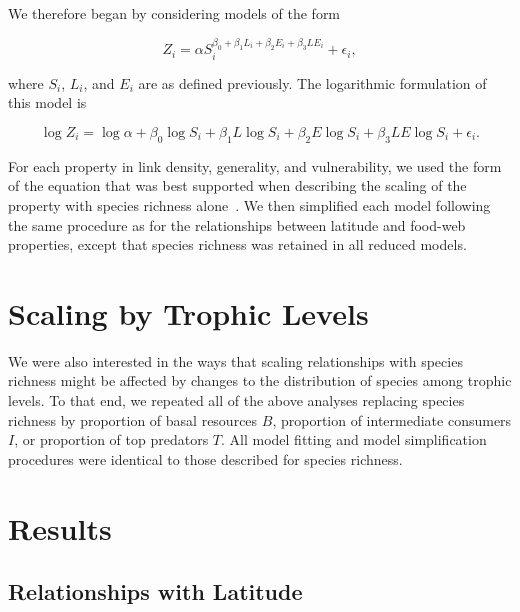 \documentclass[12pt]{article}
\begin{document}
  We therefore began by considering models of the form

  \begin{equation}
  \label{PowerLat}
  Z_{i}=\alpha S_{i}^{\beta_{0}+\beta_{1}L_{i}+\beta_{2}E_{i}+\beta_{3}LE_{i}} + \epsilon_{i} ,
  \end{equation}

  \noindent where $S_{i}$, $L_{i}$, and $E_{i}$ are as defined previously. The logarithmic formulation of this model is

  \begin{equation}
  \label{LogLat}
  \log{Z_{i}} = \log{\alpha}+\beta_{0}\log{S_{i}} + \beta_{1}L\log{S_{i}} +\beta_{2}E\log{S_{i}} +\beta_{3}LE\log{S_{i}} +\epsilon_{i} .
  \end{equation}

  For each property in link density, generality, and vulnerability, we used the form of the equation that was best supported
  when describing the scaling of the property with species richness alone~\citep{Xiao2011}.
  We then simplified each model following the same procedure as for the relationships between
  latitude and food-web properties, except that species richness was retained in all reduced models. 


\section*{Scaling by Trophic Levels}

  We were also interested in the ways that scaling relationships with species richness might
  be affected by changes to the distribution of species among trophic levels. To
  that end, we repeated all of the above analyses replacing species richness by
  proportion of basal resources $B$, proportion of intermediate consumers $I$,
  or proportion of top predators $T$. All model fitting and model
  simplification procedures were identical to those described for species
  richness.



\section*{Results}

\subsection*{Relationships with Latitude}
\end{document}
